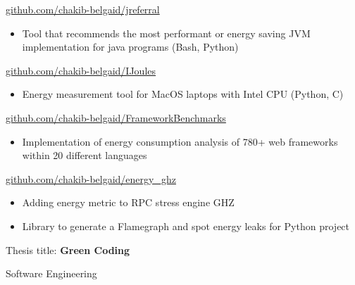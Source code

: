 \documentclass[10pt,a4paper,ragged2e,withhyper]{altacv}
\begin{document}
\begin{paracol}{2}
  \divider
   {\href{https://github.com/chakib-belgaid/jreferral}{github.com/chakib-belgaid/jreferral}}{}{}
  \begin{itemize}
    \item  Tool that recommends the most performant or energy saving JVM implementation for java programs (Bash, Python)
  \end{itemize}

  \divider
   {\href{https://github.com/chakib-belgaid/IJoules}{github.com/chakib-belgaid/IJoules}}{}{}
  \begin{itemize}
    \item  Energy measurement tool for MacOS laptops with Intel CPU (Python, C)
  \end{itemize}

  \divider
   {\href{https://github.com/chakib-belgaid/FrameworkBenchmarks}{github.com/chakib-belgaid/FrameworkBenchmarks}}{}{}
  \begin{itemize}
    \item  Implementation of energy consumption analysis of 780+ web frameworks within 20 different languages
  \end{itemize}

  \divider
   {\href{https://github.com/chakib-belgaid/energy_ghz}{github.com/chakib-belgaid/energy\_ghz}}{}{}
  \begin{itemize}
    \item  Adding energy metric to RPC stress engine GHZ \end{itemize}
  \divider
  \begin{itemize}
    \item  Library to generate a Flamegraph and spot energy leaks for Python project
  \end{itemize}



  \medskip

  Thesis title: \textbf{Green Coding}

  \divider

  Software Engineering

  \divider


\end{paracol}
\end{document}
